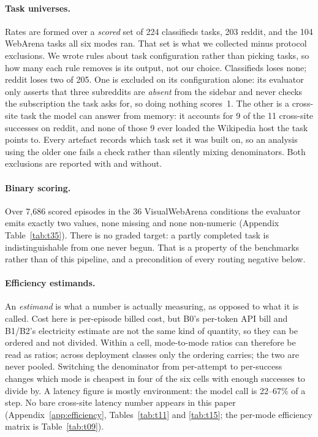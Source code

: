 \paragraph{Task universes.} Rates are formed over a \emph{scored} set of 224 classifieds tasks, 203 reddit, and the 104 WebArena tasks all six modes ran. That set is what we collected minus protocol exclusions. We wrote rules about task configuration rather than picking tasks, so how many each rule removes is its output, not our choice. Classifieds loses none; reddit loses two of 205. One is excluded on its configuration alone: its evaluator only asserts that three subreddits are \emph{absent} from the sidebar and never checks the subscription the task asks for, so doing nothing scores~1. The other is a cross-site task the model can answer from memory: it accounts for 9 of the 11 cross-site successes on reddit, and none of those 9 ever loaded the Wikipedia host the task points to. Every artefact records which task set it was built on, so an analysis using the older one fails a check rather than silently mixing denominators. Both exclusions are reported with and without.

\paragraph{Binary scoring.} Over 7{,}686 scored episodes in the 36 VisualWebArena conditions the evaluator emits exactly two values, none missing and none non-numeric (Appendix Table~\ref{tab:t35}). There is no graded target: a partly completed task is indistinguishable from one never begun. That is a property of the benchmarks rather than of this pipeline, and a precondition of every routing negative below.

\paragraph{Efficiency estimands.} An \emph{estimand} is what a number is actually measuring, as opposed to what it is called. Cost here is per-episode billed cost, but B0's per-token API bill and B1/B2's electricity estimate are not the same kind of quantity, so they can be ordered and not divided. Within a cell, mode-to-mode ratios can therefore be read as ratios; across deployment classes only the ordering carries; the two are never pooled. Switching the denominator from per-attempt to per-success changes which mode is cheapest in four of the six cells with enough successes to divide by. A latency figure is mostly environment: the model call is 22--67\% of a step. No bare cross-site latency number appears in this paper (Appendix~\ref{app:efficiency}, Tables~\ref{tab:t11} and \ref{tab:t15}; the per-mode efficiency matrix is Table~\ref{tab:t09}).

